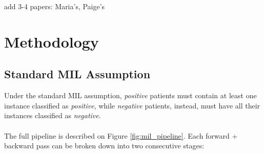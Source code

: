 \documentclass[final]{cvpr}
\begin{document}
	add 3-4 papers: Maria's, Paige's
	
	\section{Methodology}
	
	\subsection{Standard MIL Assumption} 
	
	Under the standard MIL assumption, \emph{positive} patients must contain at least one instance classified as \emph{positive}, while \emph{negative} patients, instead, must have all their instances classified as \emph{negative}.\\
	\\
	The full pipeline is described on Figure \ref{fig:mil_pipeline}. Each forward + backward pass can be broken down into two consecutive stages: 
	
\end{document}
